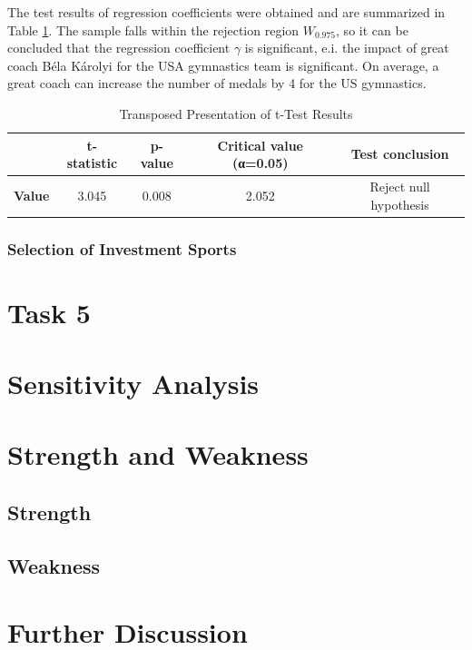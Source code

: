 \documentclass{mcmthesis}
\begin{document}
The test results of regression coefficients were obtained and are summarized in Table \ref{table:great-coach-effect_t-test}. The sample falls within the rejection region $W_{0.975}$, so it can be concluded that the regression coefficient $\gamma$ is significant, e.i. the impact of great coach Béla Károlyi for the USA gymnastics team is significant. On average, a great coach can increase the number of medals by 4 for the US gymnastics.
\begin{table}[H]
	\centering
	\caption{Transposed Presentation of t-Test Results}
	\label{table:great-coach-effect_t-test}
	\begin{tabular}{lcccc}
		\toprule
		\rowcolor{red!10}
		& \textbf{t-statistic} & \textbf{p-value} & \textbf{Critical value (α=0.05)} & \textbf{Test conclusion} \\
		\midrule
		\rowcolor{white} %
		\textbf{Value} & 3.045 & 0.008 & 2.052 & Reject null hypothesis \\
		\bottomrule
	\end{tabular}
\end{table}




\subsubsection{Selection of Investment Sports}
	
	\section{Task 5}
	
	\section{Sensitivity Analysis}
	
	\section{Strength and Weakness}
	\subsection{Strength}
	\subsection{Weakness}
	
	\section{Further Discussion}
	
\end{document}
